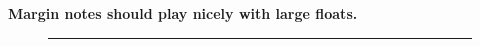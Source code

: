 \documentclass{memoir}
\begin{document}
 \textbf{Margin notes should play nicely with large floats.}

 \marginpar{\lipsum[2]}
 \lipsum[1]
 \marginpar{\color{red}\lipsum[2]}
 \marginpar{\color{blue}\lipsum[2]}
 \marginpar{\color{red}\lipsum[2]}
 \marginpar{\lipsum[2]}
 \lipsum[1]
 \lipsum[1]
 \marginpar{\color{red}\lipsum[2]}
 \lipsum[1]
 \begin{figure}[t]
   \hrule width 10pc height 10pc
 \end{figure}
 \lipsum[2-6]
\end{document}
